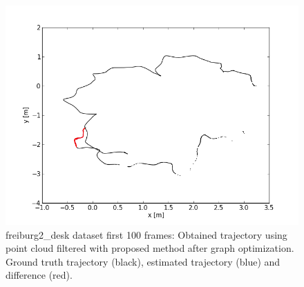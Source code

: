 \begin{figure}[H]
\begin{center}
\includegraphics[scale=0.75]{images/freiburg2_desk_1_100_optimized.png}
\caption{freiburg2\_desk dataset first 100 frames: Obtained trajectory using point cloud filtered with proposed method after graph optimization. Ground truth trajectory (black), estimated trajectory (blue) and difference (red).}
\label{fig:jan}
\end{center}
\end{figure}


